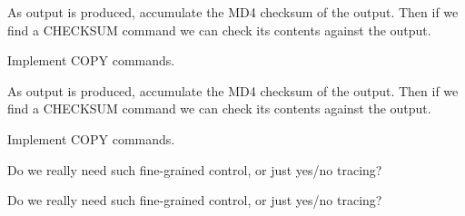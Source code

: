 
\begin{DoxyRefList}
\item[\label{todo__todo000002}%
\hypertarget{todo__todo000002}{}%
global\+Scope$>$ Member \hyperlink{patch_8c_aca51f53fcd779e06be770b994f73193c}{rs\+\_\+patch\+\_\+begin} (rs\+\_\+copy\+\_\+cb $\ast$copy\+\_\+cb, void $\ast$copy\+\_\+arg)]As output is produced, accumulate the M\+D4 checksum of the output. Then if we find a C\+H\+E\+C\+K\+S\+U\+M command we can check it\textquotesingle{}s contents against the output.

Implement C\+O\+P\+Y commands. 
\item[\label{todo__todo000002}%
\hypertarget{todo__todo000002}{}%
global\+Scope$>$ Member \hyperlink{patch_8c_aca51f53fcd779e06be770b994f73193c}{rs\+\_\+patch\+\_\+begin} (rs\+\_\+copy\+\_\+cb $\ast$copy\+\_\+cb, void $\ast$copy\+\_\+arg)]As output is produced, accumulate the M\+D4 checksum of the output. Then if we find a C\+H\+E\+C\+K\+S\+U\+M command we can check it\textquotesingle{}s contents against the output.

Implement C\+O\+P\+Y commands. 
\item[\label{todo__todo000004}%
\hypertarget{todo__todo000004}{}%
global\+Scope$>$ Member \hyperlink{trace_8c_a9b87e4fd80d6594afb23ad7189af8bc1}{rs\+\_\+trace\+\_\+to} (rs\+\_\+trace\+\_\+fn\+\_\+t $\ast$new\+\_\+impl)]Do we really need such fine-\/grained control, or just yes/no tracing?  
\item[\label{todo__todo000004}%
\hypertarget{todo__todo000004}{}%
global\+Scope$>$ Member \hyperlink{trace_8c_a9b87e4fd80d6594afb23ad7189af8bc1}{rs\+\_\+trace\+\_\+to} (rs\+\_\+trace\+\_\+fn\+\_\+t $\ast$new\+\_\+impl)]Do we really need such fine-\/grained control, or just yes/no tracing? 
\end{DoxyRefList}